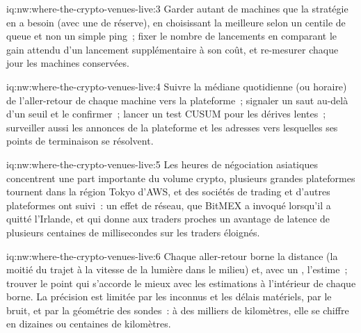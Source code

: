 \begin{solution}{iq:nw:where-the-crypto-venues-live:3}
Garder autant de machines que la stratégie en a besoin (avec une de réserve), en choisissant la meilleure selon un centile de queue et non un simple ping~; fixer le nombre de lancements en
comparant le gain attendu d'un lancement supplémentaire à son coût, et re-mesurer chaque jour les machines conservées.
\end{solution}

\begin{solution}{iq:nw:where-the-crypto-venues-live:4}
Suivre la médiane quotidienne (ou horaire) de l'aller-retour de chaque machine vers la plateforme~; signaler un saut au-delà d'un seuil et le confirmer~; lancer un test CUSUM pour les dérives lentes~;
surveiller aussi les annonces de la plateforme et les adresses vers lesquelles ses points de terminaison se résolvent.
\end{solution}

\begin{solution}{iq:nw:where-the-crypto-venues-live:5}
Les heures de négociation asiatiques concentrent une part importante du volume crypto, plusieurs grandes plateformes tournent dans la région Tokyo d'AWS, et des sociétés de trading et d'autres plateformes ont suivi~: un
effet de réseau, que BitMEX a invoqué lorsqu'il a quitté l'Irlande, et qui donne aux traders proches un avantage de latence de plusieurs centaines de millisecondes sur les
traders éloignés.
\end{solution}

\begin{solution}{iq:nw:where-the-crypto-venues-live:6}
Chaque aller-retour borne la distance (la moitié du trajet à la vitesse de la lumière dans le milieu) et, avec un , l'estime~; trouver le point qui s'accorde le mieux
avec les estimations à l'intérieur de chaque borne. La précision est limitée par les  inconnus et les délais matériels, par le bruit, et par la
géométrie des sondes~: à des milliers de kilomètres, elle se chiffre en dizaines ou centaines de kilomètres.
\end{solution}
